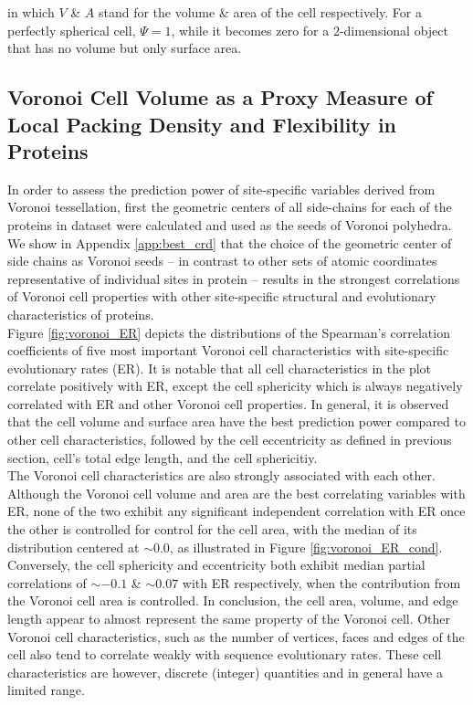 \documentclass[11pt]{article}
\begin{document}
    \noindent in which $V$ \& $A$ stand for the volume \& area of the cell respectively. For a perfectly spherical cell, $\Psi=1$, while it becomes zero for a 2-dimensional object that has no volume but only surface area.

    \subsection*{Voronoi Cell Volume as a Proxy Measure of Local Packing Density and Flexibility in Proteins}



    In order to assess the prediction power of site-specific variables derived from Voronoi tessellation, first the geometric centers of all side-chains for each of the proteins in dataset were calculated and used as the seeds of Voronoi polyhedra. We show in Appendix \ref{app:best_crd} that the choice of the geometric center of side chains as Voronoi seeds -- in contrast to other sets of atomic coordinates representative of individual sites in protein -- results in the strongest correlations of Voronoi cell properties with other site-specific structural and evolutionary characteristics of proteins.  \\

    Figure \ref{fig:voronoi_ER} depicts the distributions of the Spearman's correlation coefficients of five most important Voronoi cell characteristics with site-specific evolutionary rates (ER). It is notable that all cell characteristics in the plot correlate positively with ER, except the cell sphericity which is always negatively correlated with ER and other Voronoi cell properties. In general, it is observed that the cell volume and surface area have the best prediction power compared to other cell characteristics, followed by the cell eccentricity as defined in previous section, cell's total edge length, and the cell sphericitiy. \\

    The Voronoi cell characteristics are also strongly associated with each other. Although the Voronoi cell volume and area are the best correlating variables with ER, none of the two exhibit any significant independent correlation with ER once the other is controlled for control for the cell area, with the median of its distribution centered at $\sim0.0$, as illustrated in Figure \ref{fig:voronoi_ER_cond}. Conversely, the cell sphericity and eccentricity both exhibit median partial correlations of $\sim-0.1$ \& $\sim0.07$ with ER respectively, when the contribution from the Voronoi cell area is controlled. In conclusion, the cell area, volume, and edge length appear to almost represent the same property of the Voronoi cell. Other Voronoi cell characteristics, such as the number of vertices, faces and edges of the cell also tend to correlate weakly with sequence evolutionary rates. These cell characteristics are however, discrete (integer) quantities and in general have a limited range. \\
\end{document}
